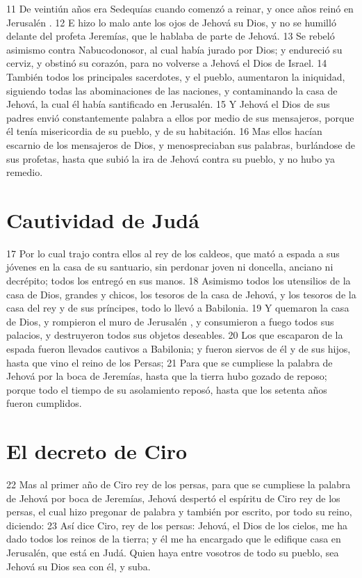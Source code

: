 11 De veintiún años era Sedequías cuando comenzó a reinar, y once años reinó en Jerusalén .
12 E hizo lo malo ante los ojos de Jehová su Dios, y no se humilló delante del profeta Jeremías, que le hablaba de parte de Jehová.
13 Se rebeló asimismo contra Nabucodonosor, al cual había jurado por Dios; y endureció su cerviz, y obstinó su corazón, para no volverse a Jehová el Dios de Israel.
14 También todos los principales sacerdotes, y el pueblo, aumentaron la iniquidad, siguiendo todas las abominaciones de las naciones, y contaminando la casa de Jehová, la cual él había santificado en Jerusalén. 
15 Y Jehová el Dios de sus padres envió constantemente palabra a ellos por medio de sus mensajeros, porque él tenía misericordia de su pueblo, y de su habitación.
16 Mas ellos hacían escarnio de los mensajeros de Dios, y menospreciaban sus palabras, burlándose de sus profetas, hasta que subió la ira de Jehová contra su pueblo, y no hubo ya remedio.

\section*{Cautividad de Judá}


17 Por lo cual trajo contra ellos al rey de los caldeos, que mató a espada a sus jóvenes en la casa de su santuario, sin perdonar joven ni doncella, anciano ni decrépito; todos los entregó en sus manos.
18 Asimismo todos los utensilios de la casa de Dios, grandes y chicos, los tesoros de la casa de Jehová, y los tesoros de la casa del rey y de sus príncipes, todo lo llevó a Babilonia.
19 Y quemaron la casa de Dios, y rompieron el muro de Jerusalén , y consumieron a fuego todos sus palacios, y destruyeron todos sus objetos deseables.
20 Los que escaparon de la espada fueron llevados cautivos a Babilonia; y fueron siervos de él y de sus hijos, hasta que vino el reino de los Persas;
21 Para que se cumpliese la palabra de Jehová por la boca de Jeremías, hasta que la tierra hubo gozado de reposo; porque todo el tiempo de su asolamiento reposó, hasta que los setenta años fueron cumplidos. 

\section*{El decreto de Ciro}

22 Mas al primer año de Ciro rey de los persas, para que se cumpliese la palabra de Jehová por boca de Jeremías, Jehová despertó el espíritu de Ciro rey de los persas, el cual hizo  pregonar de palabra y también por escrito, por todo su reino,  diciendo:
23 Así dice Ciro, rey de los persas: Jehová, el Dios de los cielos, me ha dado todos los reinos de la tierra; y él me ha encargado que le edifique casa en Jerusalén, que está en Judá. Quien haya entre vosotros de todo su pueblo, sea Jehová su Dios sea con él, y suba.

